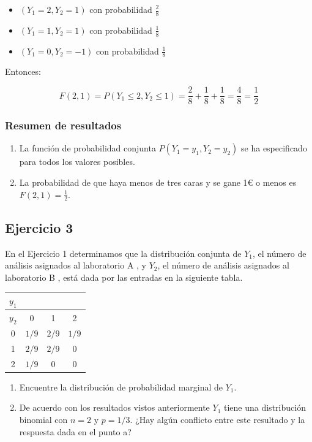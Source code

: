 \documentclass[
]{article}
\providecommand{\tightlist}{%
  \setlength{\itemsep}{0pt}\setlength{\parskip}{0pt}}
\begin{document}
\begin{itemize}
\tightlist
\item
  \((Y_1 = 2, Y_2 = 1)\) con probabilidad \(\frac{2}{8}\)
\item
  \((Y_1 = 1, Y_2 = 1)\) con probabilidad \(\frac{1}{8}\)
\item
  \((Y_1 = 0, Y_2 = -1)\) con probabilidad \(\frac{1}{8}\)
\end{itemize}

Entonces:

\[
F(2, 1) = P(Y_1 \leq 2, Y_2 \leq 1) = \frac{2}{8} + \frac{1}{8} + \frac{1}{8} = \frac{4}{8} = \frac{1}{2}
\]

\subsubsection{Resumen de resultados}\label{resumen-de-resultados-1}

\begin{enumerate}
\def\labelenumi{\arabic{enumi}.}
\tightlist
\item
  La función de probabilidad conjunta \(P(Y_1 = y_1, Y_2 = y_2)\) se ha especificado para todos los valores posibles.
\item
  La probabilidad de que haya menos de tres caras y se gane 1€ o menos es \(F(2, 1) = \frac{1}{2}\).
\end{enumerate}

\subsection{Ejercicio 3}\label{ejercicio-3}

En el Ejercicio 1 determinamos que la distribución conjunta de \(Y_{1}\), el número de análisis asignados al laboratorio A , y \(Y_{2}\), el número de análisis asignados al laboratorio B , está dada por las entradas en la siguiente tabla.

\begin{longtable}[]{@{}cccc@{}}
\toprule\noalign{}
\(y_{1}\) & & & \\
\midrule\noalign{}
\endhead
\bottomrule\noalign{}
\endlastfoot
\(y_{2}\) & 0 & 1 & 2 \\
0 & \(1 / 9\) & \(2 / 9\) & \(1 / 9\) \\
1 & \(2 / 9\) & \(2 / 9\) & 0 \\
2 & \(1 / 9\) & 0 & 0 \\
\end{longtable}

\begin{enumerate}
\def\labelenumi{\alph{enumi}.}
\tightlist
\item
  Encuentre la distribución de probabilidad marginal de \(Y_{1}\).
\item
  De acuerdo con los resultados vistos anteriormente \(Y_{1}\) tiene una distribución binomial con \(n=2\) y \(p=1 / 3\). ¿Hay algún conflicto entre este resultado y la respuesta dada en el punto a?
\end{enumerate}
\end{document}

